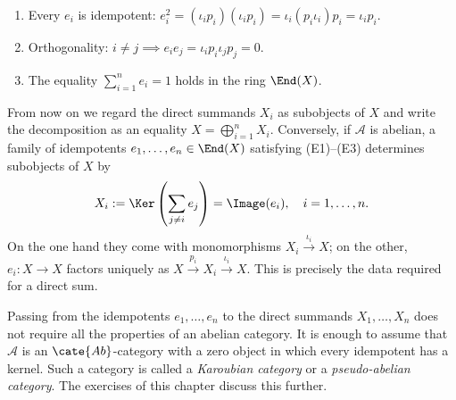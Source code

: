\begin{enumerate}[(E1)]
	\item Every $e_i$ is idempotent:
	$e_i^2=(\iota_ip_i)(\iota_ip_i)=\iota_i(p_i\iota_i)p_i=\iota_ip_i$.
	\item Orthogonality: $i\neq j\implies
	e_ie_j=\iota_ip_i\iota_jp_j=0$.
	\item The equality $\sum_{i=1}^ne_i=1$ holds in the ring $\End(X)$.
\end{enumerate}

From now on we regard the direct summands $X_i$ as subobjects of $X$ and
write the decomposition as an equality $X=\bigoplus_{i=1}^nX_i$.
Conversely, if $\mathcal{A}$ is abelian, a family of idempotents
$e_1,\ldots,e_n\in\End(X)$ satisfying (E1)--(E3) determines subobjects of
$X$ by
\[ X_i := \Ker\left( \sum_{j \neq i} e_j \right) = \Image(e_i), \quad i=1, \ldots, n. \]
On the one hand they come with monomorphisms $X_i\xrightarrow{\iota_i}X$;
on the other, $e_i:X\to X$ factors uniquely as
$X\xrightarrow{p_i}X_i\xrightarrow{\iota_i}X$. This is precisely the data
required for a direct sum.

Passing from the idempotents $e_1,\ldots,e_n$ to the direct summands
$X_1,\ldots,X_n$ does not require all the properties of an abelian category.
It is enough to assume that $\mathcal{A}$ is an $\cate{Ab}$-category with a
zero object in which every idempotent has a kernel. Such a category is called
a \emph{Karoubian category} or a \emph{pseudo-abelian category}. The exercises
of this chapter discuss this further.

